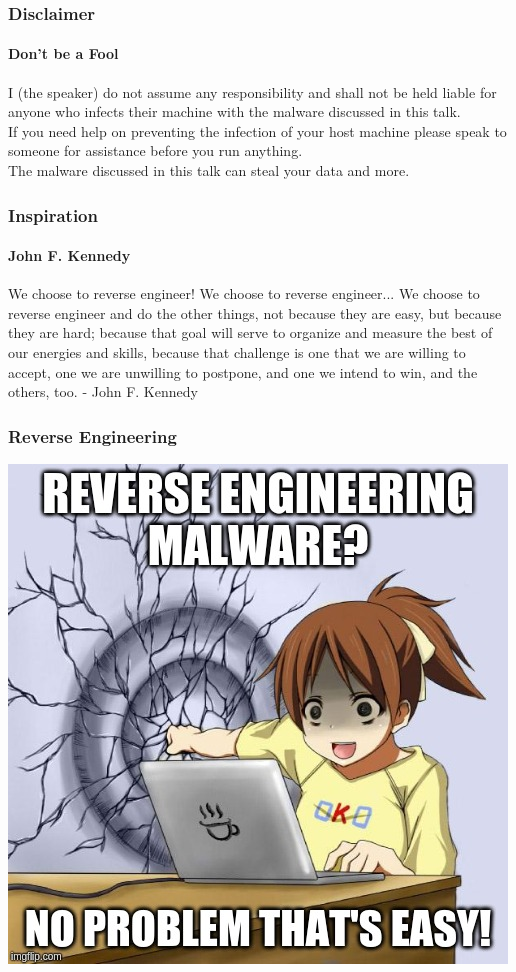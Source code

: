 \documentclass[aspectratio=169]{beamer}
\begin{document}
\begin{frame}
  \frametitle{Disclaimer}
  \framesubtitle{Don't be a Fool}
  \begin{tcolorbox}[title=disclaimer\_1.log,colback=gray]
    I (the speaker) do not assume any responsibility and shall not be held
    liable for anyone who infects their machine with the malware discussed in
    this talk. \\
    \newline
    If you need help on preventing the infection of your host machine please
    speak to someone for assistance before you run anything. \\
    \newline
    The malware discussed in this talk can steal your data and more. \\
  \end{tcolorbox}
\end{frame}

\begin{frame}
  \frametitle{Inspiration}
  \framesubtitle{John F. Kennedy}
  \begin{tcolorbox}[title=john\_f\_kennedy.log,colback=gray]
    We choose to reverse engineer! We choose to reverse
    engineer... We choose to reverse engineer and do the other things, not
    because they are easy, but because they are hard; because that goal will
    serve to organize and measure the best of our energies and skills, because
    that challenge is one that we are willing to accept, one we are unwilling to
    postpone, and one we intend to win, and the others, too. - John F. Kennedy \\
  \end{tcolorbox}
\end{frame}

\begin{frame}
  \frametitle{Reverse Engineering}
  \begin{center}
    \includegraphics[scale=0.4]{reverse-engineering}
  \end{center}
\end{frame}
\end{document}
